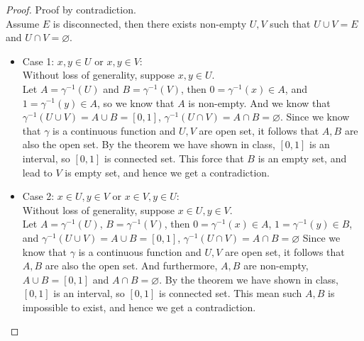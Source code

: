 \begin{proof}
    Proof by contradiction. \\
    Assume $E$ is disconnected, then there exists non-empty $U, V$ such that $U \cup V = E$ and $U \cap V = \varnothing$.
    \begin{itemize}
        \item Case 1: $x,y \in U$ or $x,y \in V$: \\
        Without loss of generality, suppose $x, y \in U$.\\
        Let $A = \gamma^{-1}(U)$ and $B = \gamma^{-1}(V)$, then $0 = \gamma^{-1}(x) \in A$, and $1 = \gamma^{-1}(y) \in A$, so we know that $A$ is non-empty. And we know that $\gamma^{-1}(U \cup V) = A \cup B = [0,1]$, $\gamma^{-1}(U \cap V) = A \cap B = \varnothing$. Since we know that $\gamma$ is a continuous function and $U, V$ are open set, it follows that $A, B$ are also the open set. By the theorem we have shown in class, $[0,1]$ is an interval, so $[0,1]$ is connected set. This force that $B$ is an empty set, and lead to $V$ is empty set, and hence we get a contradiction. 
        \item Case 2: $x\in U, y \in V$ or $x \in V, y \in U$: \\
        Without loss of generality, suppose $x\in U, y \in V$. \\
        Let $A = \gamma^{-1}(U)$, $B = \gamma^{-1}(V)$, then $0 = \gamma^{-1}(x) \in A$, $1 = \gamma^{-1}(y) \in B$, and $\gamma^{-1}(U \cup V) = A \cup B = [0,1]$, $\gamma^{-1}(U \cap V) = A \cap B = \varnothing$ Since we know that $\gamma$ is a continuous function and $U, V$ are open set, it follows that $A, B$ are also the open set. And furthermore, $A, B$ are non-empty, $A \cup B = [0,1]$ and $A \cap B = \varnothing$. By the theorem we have shown in class, $[0,1]$ is an interval, so $[0,1]$ is connected set. This mean such $A, B$ is impossible to exist, and hence we get a contradiction.
    \end{itemize}
\end{proof}


